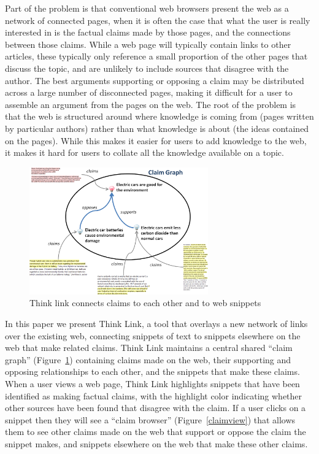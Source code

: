 \documentclass{chi2009}
\begin{document}
Part of the problem is that conventional web browsers present the web as a network of connected pages, when it is often the case that what the user is really interested in is the factual claims made by those pages, and the connections between those claims. While a web page will typically contain links to other articles, these typically only reference a small proportion of the other pages that discuss the topic, and are unlikely to include sources that disagree with the author. The best arguments supporting or opposing a claim may be distributed across a large number of disconnected pages, making it difficult for a user to assemble an argument from the pages on the web. The root of the problem is that the web is structured around where knowledge is coming from (pages written by particular authors) rather than what knowledge is about (the ideas contained on the pages). While this makes it easier for users to add knowledge to the web, it makes it hard for users to collate all the knowledge available on a topic.

\begin{figure}[tb]
	\begin{center}
	\includegraphics[width=7.7cm]{../screenshots/summary_graph.png}
	\caption{Think link connects claims to each other and to web snippets}
	\label{summarygraph}
	\end{center}
\end{figure}

In this paper we present Think Link, a tool that overlays a new network of links over the existing web, connecting snippets of text to snippets elsewhere on the web that make related claims. Think Link maintains a central shared ``claim graph'' (Figure~\ref{summarygraph}) containing claims made on the web, their supporting and opposing relationships to each other, and the snippets that make these claims. When a user views a web page, Think Link highlights snippets that have been identified as making factual claims, with the highlight color indicating whether other sources have been found that disagree with the claim. If a user clicks on a snippet then they will see a ``claim browser'' (Figure~\ref{claimview}) that allows them to see other claims made on the web that support or oppose the claim the snippet makes, and snippets elsewhere on the web that make these other claims. 
\end{document}
